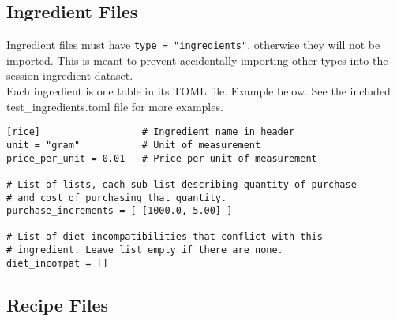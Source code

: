 \documentclass{article}
\begin{document}
\subsection{Ingredient Files}
Ingredient files must have \verb|type = "ingredients"|, otherwise they will not be imported. This is meant to prevent accidentally
importing other types into the session ingredient dataset. \\

Each ingredient is one table in its TOML file. Example below. See the included test\_ingredients.toml file for more examples. 

\begin{verbatim}
[rice]                  # Ingredient name in header
unit = "gram"           # Unit of measurement
price_per_unit = 0.01   # Price per unit of measurement 

# List of lists, each sub-list describing quantity of purchase 
# and cost of purchasing that quantity. 
purchase_increments = [ [1000.0, 5.00] ]

# List of diet incompatibilities that conflict with this 
# ingredient. Leave list empty if there are none. 
diet_incompat = []
\end{verbatim}

\subsection{Recipe Files}
\end{document}
